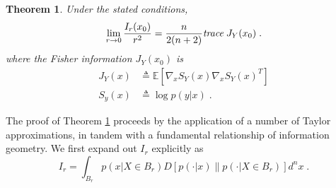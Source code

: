 \documentclass[english]{scrartcl}
\newtheorem{thm}{Theorem}
\newcommand\E[0]{\mathbb{E}}
\begin{document}
	\begin{thm} \label{thm1}
		Under the stated conditions, 
		\begin{equation}
			\lim_{r\rightarrow 0} \frac{I_r(x_0)}{r^2} = \frac{n}{2(n+2)} \emph{trace}\; J_Y(x_0)\;.
		\end{equation}
		where the Fisher information $J_Y(x_0)$ is 
		\begin{align}
		J_Y(x) &\triangleq \E\left[\nabla_x S_{Y}(x)\nabla_x S_{Y}(x)^T \right] \\
		S_y(x) &\triangleq \log p(y|x)\;.
	\end{align}
	\end{thm}
	The proof of Theorem \ref{thm1} proceeds by the application of a number of Taylor approximations, in tandem with a fundamental relationship of information geometry. We first expand out $I_r$ explicitly as
	\begin{equation}
		I_r = \int_{B_r} p(x|X \in B_r) D[p(\cdot|x)\| p(\cdot|X \in B_r)] d^n x\;. \label{eq:explicit}
	\end{equation}
\end{document}
